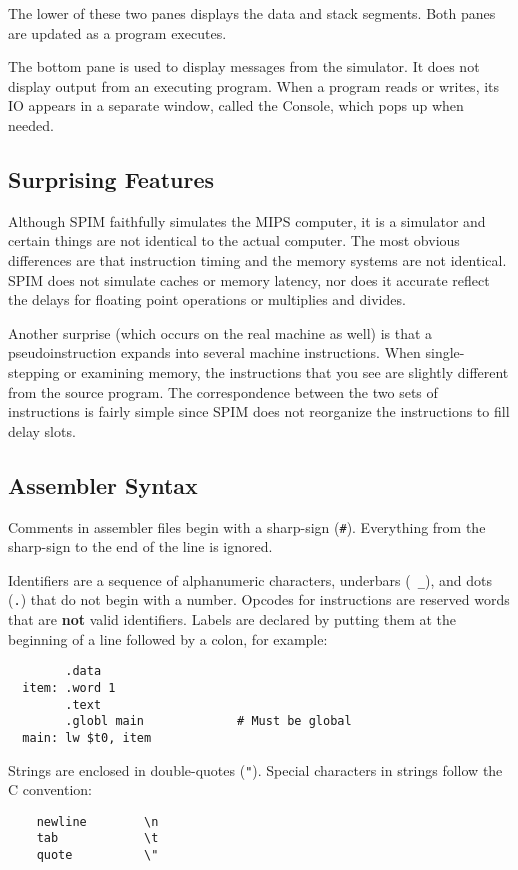 \documentclass[11pt]{article}
\begin{document}
The lower of these two panes displays the data and stack segments.
Both panes are updated as a program executes.

The bottom pane is used to display messages from the simulator.  It
does not display output from an executing program.  When a program
reads or writes, its IO appears in a separate window, called the
Console, which pops up when needed.

\subsection{Surprising Features}

Although SPIM faithfully simulates the MIPS computer, it is a
simulator and certain things are not identical to the actual computer.
The most obvious differences are that instruction timing and the
memory systems are not identical.  SPIM does not simulate caches or
memory latency, nor does it accurate reflect the delays for floating
point operations or multiplies and divides.

Another surprise (which occurs on the real machine as well) is that a
pseudoinstruction expands into several machine instructions.  When
single-stepping or examining memory, the instructions that you see are
slightly different from the source program.  The correspondence
between the two sets of instructions is fairly simple since SPIM does
not reorganize the instructions to fill delay slots.

\subsection{Assembler Syntax}
\label{sec:syntax}

Comments in assembler files begin with a sharp-sign ({\tt \#}).
Everything from the sharp-sign to the end of the line is ignored.

Identifiers are a sequence of alphanumeric characters, underbars ({\tt
\_}), and dots ({\tt .}) that do not begin with a number.  Opcodes for
instructions are reserved words that are {\bf not} valid identifiers.
Labels are declared by putting them at the beginning of a line
followed by a colon, for example:
\begin{verbatim}
        .data
  item: .word 1
        .text
        .globl main             # Must be global
  main: lw $t0, item
\end{verbatim}

Strings are enclosed in double-quotes ({\tt "}).  Special characters
in strings follow the C convention:
\begin{verbatim}
    newline        \n
    tab            \t
    quote          \"
\end{verbatim}
\end{document}
